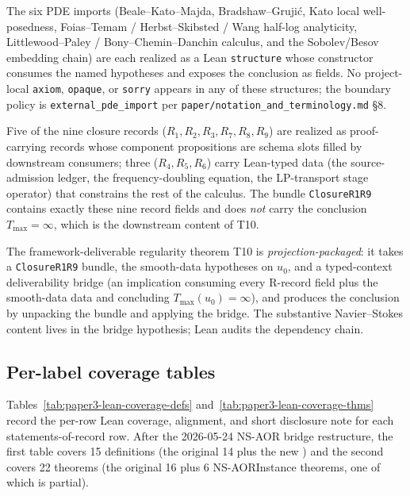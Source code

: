 \documentclass[11pt]{article}
\newcommand{\Tmax}{T_{\max}}
\theoremstyle{definition}
\begin{document}
The six PDE imports (Beale--Kato--Majda, Bradshaw--Grujić, Kato local
well-posedness, Foias--Temam / Herbst--Skibsted / Wang half-log
analyticity, Littlewood--Paley / Bony--Chemin--Danchin calculus, and the
Sobolev/Besov embedding chain) are each realized as a Lean
\texttt{structure} whose constructor consumes the named hypotheses and
exposes the conclusion as fields.  No project-local \texttt{axiom},
\texttt{opaque}, or \texttt{sorry} appears in any of these structures;
the boundary policy is \texttt{external\_pde\_import} per
\texttt{paper/notation\_and\_terminology.md} §8.

Five of the nine closure records ($R_1, R_2, R_3, R_7, R_8, R_9$) are
realized as proof-carrying records whose component propositions are
schema slots filled by downstream consumers; three ($R_4, R_5, R_6$)
carry Lean-typed data (the source-admission ledger, the
frequency-doubling equation, the LP-transport stage operator) that
constrains the rest of the calculus.  The bundle
\texttt{ClosureR1R9} contains exactly these nine record fields and
does \emph{not} carry the conclusion $\Tmax = \infty$, which is the
downstream content of T10.

The framework-deliverable regularity theorem T10 is
\emph{projection-packaged}: it takes a \texttt{ClosureR1R9} bundle, the
smooth-data hypotheses on $u_0$, and a typed-context deliverability
bridge (an implication consuming every R-record field plus the
smooth-data data and concluding $\Tmax(u_0) = \infty$), and produces
the conclusion by unpacking the bundle and applying the bridge.  The
substantive Navier--Stokes content lives in the bridge hypothesis; Lean
audits the dependency chain.

\subsection{Per-label coverage tables}
\label{subsec:paper3-per-label-coverage}

Tables~\ref{tab:paper3-lean-coverage-defs} and~\ref{tab:paper3-lean-coverage-thms}
record the per-row Lean coverage, alignment, and short disclosure note for each
statements-of-record row.  After the 2026-05-24 NS-AOR bridge restructure,
the first table covers 15 definitions (the original 14 plus the new
) and the second covers 22 theorems
(the original 16 plus 6 NS-AORInstance theorems, one of which is partial).
\end{document}
